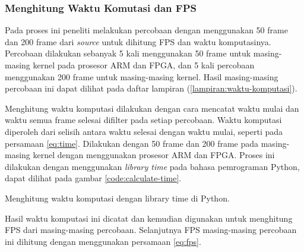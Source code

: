 \subsubsection{Menghitung Waktu Komutasi dan FPS}
Pada proses ini peneliti melakukan percobaan dengan menggunakan 50 frame dan 200 frame dari \textit{source} untuk dihitung FPS dan waktu komputasinya. Percobaan dilakukan sebanyak 5 kali menggunakan 50 frame untuk masing-masing kernel pada prosesor ARM dan FPGA, dan 5 kali percobaan menggunakan 200 frame untuk masing-masing kernel. Hasil masing-masing percobaan ini dapat dilihat pada daftar lampiran (\ref{lampiran:waktu-komputasi}).

Menghitung waktu komputasi dilakukan dengan cara mencatat waktu mulai dan waktu semua frame selesai difilter pada setiap percobaan. Waktu komputasi diperoleh dari selisih antara waktu selesai dengan waktu mulai, seperti pada persamaan \ref{eq:time}. Dilakukan dengan 50 frame dan 200 frame pada masing-masing kernel dengan menggunakan prosesor ARM dan FPGA. Proses ini dilakukan dengan menggunakan \textit{library time} pada bahasa pemrograman Python, dapat dilihat pada gambar \ref{code:calculate-time}.
\begin{afigure}
    
    \caption{Menghitung waktu komputasi dengan library time di Python.}
    \label{code:calculate-time}
\end{afigure}

Hasil waktu komputasi ini dicatat dan kemudian digunakan untuk menghitung FPS dari masing-masing percobaan. Selanjutnya FPS masing-masing percobaan ini dihitung dengan menggunakan persamaan \ref{eq:fps}.

